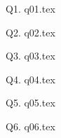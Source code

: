 


\newcommand\myincludetex[1]{\textbox{{\scriptsize \texttt{#1}}}


    

}

\newcommand\myincludesrc[1]{\textbox{{\scriptsize \texttt{#1}}}


    \VerbatimInput[fontsize=\footnotesize,frame=single]{#1}

}
    

        Q1. {q01.tex}
        
\newpage
        

        Q2. {q02.tex}
        
\newpage
        

        Q3. {q03.tex}
        
\newpage
        

        Q4. {q04.tex}
        

        

        
\newpage
        

        Q5. {q05.tex}
        

        

        

        

        

        
\newpage
        

        Q6. {q06.tex}
        

    